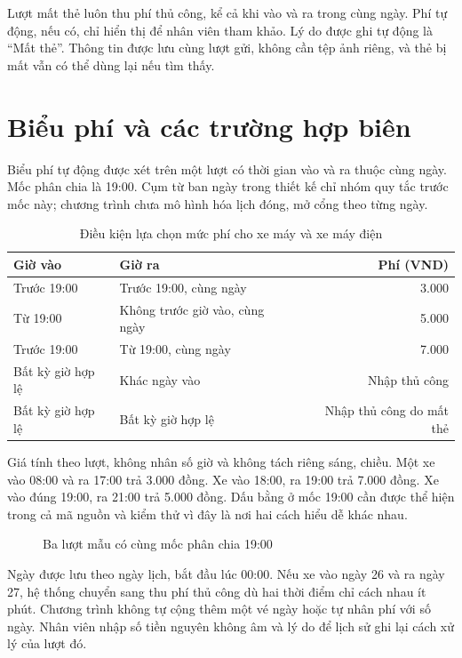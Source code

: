Lượt mất thẻ luôn thu phí thủ công, kể cả khi vào và ra trong cùng ngày. Phí tự động, nếu có, chỉ hiển thị để nhân viên tham khảo. Lý do được ghi tự động là “Mất thẻ”. Thông tin được lưu cùng lượt gửi, không cần tệp ảnh riêng, và thẻ bị mất vẫn có thể dùng lại nếu tìm thấy.

\section{Biểu phí và các trường hợp biên}
Biểu phí tự động được xét trên một lượt có thời gian vào và ra thuộc cùng ngày. Mốc phân chia là 19:00. Cụm từ ban ngày trong thiết kế chỉ nhóm quy tắc trước mốc này; chương trình chưa mô hình hóa lịch đóng, mở cổng theo từng ngày.

\begin{table}[H]
\centering\small
\caption{Điều kiện lựa chọn mức phí cho xe máy và xe máy điện}
\label{tab:fees}
\begin{tabularx}{\textwidth}{Y Y r}
\toprule
Giờ vào & Giờ ra & Phí (VND)\\
\midrule
Trước 19:00 & Trước 19:00, cùng ngày & 3.000\\
Từ 19:00 & Không trước giờ vào, cùng ngày & 5.000\\
Trước 19:00 & Từ 19:00, cùng ngày & 7.000\\
Bất kỳ giờ hợp lệ & Khác ngày vào & Nhập thủ công\\
Bất kỳ giờ hợp lệ & Bất kỳ giờ hợp lệ & Nhập thủ công do mất thẻ\\
\bottomrule
\end{tabularx}
\end{table}

Giá tính theo lượt, không nhân số giờ và không tách riêng sáng, chiều. Một xe vào 08:00 và ra 17:00 trả 3.000 đồng. Xe vào 18:00, ra 19:00 trả 7.000 đồng. Xe vào đúng 19:00, ra 21:00 trả 5.000 đồng. Dấu bằng ở mốc 19:00 cần được thể hiện trong cả mã nguồn và kiểm thử vì đây là nơi hai cách hiểu dễ khác nhau.

\begin{figure}[H]
\centering

\caption{Ba lượt mẫu có cùng mốc phân chia 19:00}
\label{fig:fee-timeline}
\end{figure}

Ngày được lưu theo ngày lịch, bắt đầu lúc 00:00. Nếu xe vào ngày 26 và ra ngày 27, hệ thống chuyển sang thu phí thủ công dù hai thời điểm chỉ cách nhau ít phút. Chương trình không tự cộng thêm một vé ngày hoặc tự nhân phí với số ngày. Nhân viên nhập số tiền nguyên không âm và lý do để lịch sử ghi lại cách xử lý của lượt đó.

